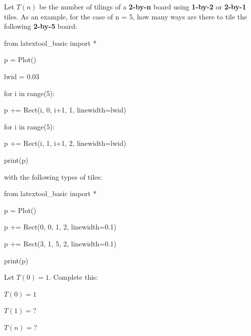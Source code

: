 Let $T(n)$ be the number of tilings of a \textbf{2-by-n} board using \textbf{1-by-2} or \textbf{2-by-1} tiles. As an example, for the case of n = 5, how many ways are there to tile the following \textbf{2-by-5} board:



\begin{python}

from latextool_basic import *

p = Plot()

lwid = 0.03

for i in range(5):

    p += Rect(i, 0, i+1, 1, linewidth=lwid)

for i in range(5):

    p += Rect(i, 1, i+1, 2, linewidth=lwid)

print(p)

\end{python}



with the following types of tiles:



\begin{python}

from latextool_basic import *

p = Plot()

p += Rect(0, 0, 1, 2, linewidth=0.1)

p += Rect(3, 1, 5, 2, linewidth=0.1)

print(p)

\end{python}



Let $T(0) = 1$. Complete this:



$T(0) = 1$



$T(1) = ?$



$T(n) = ?$


